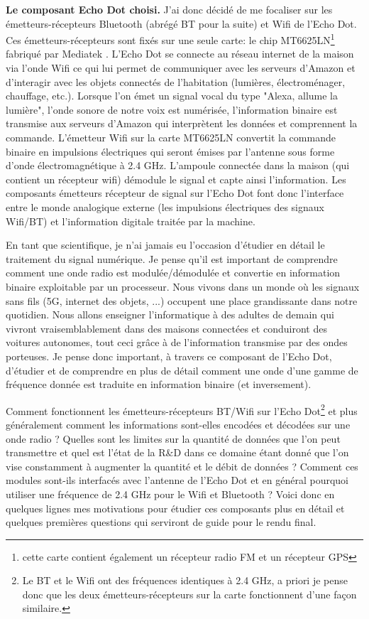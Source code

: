 \documentclass[12pt,svgnames]{article}
\begin{document}
 
\textbf{Le composant Echo Dot choisi.}
J'ai donc décidé de me focaliser sur les émetteurs-récepteurs Bluetooth (abrégé BT pour la suite) et Wifi de l'Echo Dot. Ces émetteurs-récepteurs sont fixés sur une seule carte: le chip MT6625LN\footnote{cette carte contient également un récepteur radio FM et un récepteur GPS} fabriqué par Mediatek \cite{MT6625LN} . L'Echo Dot se connecte au réseau internet de la maison via l'onde Wifi ce qui lui permet de communiquer avec les serveurs d'Amazon et d'interagir avec les objets connectés de l'habitation (lumières, électroménager, chauffage, etc.). Lorsque l'on émet un signal vocal du type "Alexa, allume la lumière", l'onde sonore de notre voix est numérisée, l'information binaire est transmise aux serveurs d'Amazon qui interprètent les données et comprennent la commande. L'émetteur Wifi sur la carte MT6625LN convertit la commande binaire en impulsions électriques qui seront émises par l'antenne sous forme d'onde électromagnétique à 2.4 GHz. L'ampoule connectée dans la maison (qui contient un récepteur wifi) démodule le signal et capte ainsi l'information.
Les composants émetteurs récepteur de signal sur l'Echo Dot font donc l'interface entre le monde analogique externe (les impulsions électriques des signaux Wifi/BT) et l'information digitale traitée par la machine.

En tant que scientifique, je n'ai jamais eu l'occasion d'étudier en détail le traitement du signal numérique. Je pense qu'il est important de comprendre comment une onde radio est modulée/démodulée et convertie en information binaire exploitable par un processeur. Nous vivons dans un monde où les signaux sans fils (5G, internet des objets, ...) occupent une place grandissante dans notre quotidien. Nous allons enseigner l'informatique à des adultes de demain qui vivront vraisemblablement dans des maisons connectées et conduiront des voitures autonomes, tout ceci grâce à de l'information transmise par des ondes porteuses. Je pense donc important, à travers ce composant de l'Echo Dot, d'étudier et de comprendre en plus de détail comment une onde d'une gamme de fréquence donnée est traduite en information binaire (et inversement).


Comment fonctionnent les émetteurs-récepteurs BT/Wifi sur l'Echo Dot\footnote{Le BT et le Wifi ont des fréquences identiques à 2.4 GHz, a priori je pense donc que les deux émetteurs-récepteurs sur la carte fonctionnent d'une façon similaire.} et plus généralement comment les informations sont-elles encodées et décodées sur une onde radio ? Quelles sont les limites sur la quantité de données que l'on peut transmettre et quel est l'état de la R\&D dans ce domaine étant donné que l'on vise constamment à augmenter la quantité et le débit de données ?
Comment ces modules sont-ils interfacés avec l'antenne de l'Echo Dot et en général pourquoi utiliser une fréquence de 2.4 GHz pour le Wifi et Bluetooth ?
Voici donc en quelques lignes mes motivations pour étudier ces composants plus en détail et quelques premières questions qui serviront de guide pour le rendu final.
\end{document}
